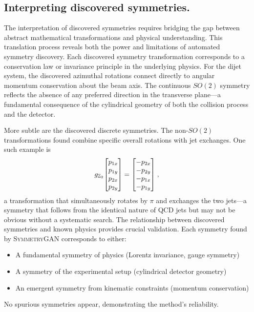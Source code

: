         \subsection{Interpreting discovered symmetries.}
            The interpretation of discovered symmetries requires bridging the gap between abstract mathematical transformations and physical understanding.
            This translation process reveals both the power and limitations of automated symmetry discovery.
            Each discovered symmetry transformation corresponds to a conservation law or invariance principle in the underlying physics.
            For the dijet system, the discovered azimuthal rotations connect directly to angular momentum conservation about the beam axis.
            The continuous \(SO(2)\) symmetry reflects the absence of any preferred direction in the transverse plane---a fundamental consequence of the cylindrical geometry of both the collision process and the detector.
            
            More subtle are the discovered discrete symmetries.
            The non-\(SO(2)\) transformations found combine specific overall rotations with jet exchanges.
            One such example is
            \[
                g_{\mathbb{Z}_2}\mqty[p_{1x}\\ p_{1y}\\ p_{2x}\\ p_{2y}] = \mqty[-p_{2x} \\ -p_{2y} \\ -p_{1x} \\ -p_{1y}]\;,
            \]
            a transformation that simultaneously rotates by \(\pi\) and exchanges the two jets---a symmetry that follows from the identical nature of QCD jets but may not be obvious without a systematic search.        
            The relationship between discovered symmetries and known physics provides crucial validation.
            Each symmetry found by \textsc{SymmetryGAN} corresponds to either:
            \begin{itemize}
                \item A fundamental symmetry of physics (Lorentz invariance, gauge symmetry)
                \item A symmetry of the experimental setup (cylindrical detector geometry)
                \item An emergent symmetry from kinematic constraints (momentum conservation)
            \end{itemize}
            No spurious symmetries appear, demonstrating the method's reliability.
            
